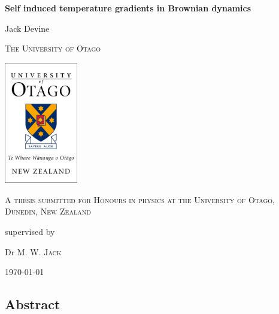 \documentclass[12pt]{book} %
\begin{document}
\frontmatter
	\begin{titlepage}
		\centering
		{\huge\bfseries Self induced temperature gradients in Brownian dynamics\par}
		\vspace{1cm}
		{\huge Jack Devine\par}
		\vspace{1cm}
		{\scshape\LARGE The University of Otago \par}
		\vspace{1cm}
		\includegraphics[width=0.24\textwidth]{OtagoLogo.eps}\par\vspace{1cm}
		\vspace{1cm}
		{\scshape\Large A thesis submitted for Honours in physics at the University of Otago, Dunedin, New Zealand\par}
		\vspace{2cm}
		\vfill
		supervised by\par
		Dr M. W. \textsc{Jack}

		\vfill

		{\large \today\par}
	\end{titlepage}


\newpage
%
\begin{center}
\section*{Abstract} %
\end{center}
\end{document}
